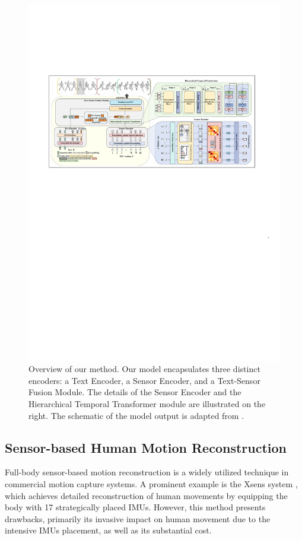 \documentclass[letterpaper]{article} %
\begin{document}
\begin{figure}[!t]
\renewcommand{\baselinestretch}{1.0}
\centering 
\includegraphics[width=7 in, height=3 in]{net_result.pdf}
\caption{Overview of our method. Our model encapsulates three distinct encoders: a Text Encoder, a Sensor Encoder, and a Text-Sensor Fusion Module. The details of the Sensor Encoder and the Hierarchical Temporal Transformer module are illustrated on the right. The schematic of the model output is adapted from \cite{BABEL:CVPR:2021}.}\label{fig2}
\end{figure}
\subsection{Sensor-based Human Motion Reconstruction}
Full-body sensor-based motion reconstruction is a widely utilized technique in commercial motion capture systems. A prominent example is the Xsens system \cite{schepers2018xsens}, which achieves detailed reconstruction of human movements by equipping the body with 17 strategically placed IMUs.
However, this method presents drawbacks, primarily its invasive impact on human movement due to the intensive IMUs placement, as well as its substantial cost.
\end{document}
